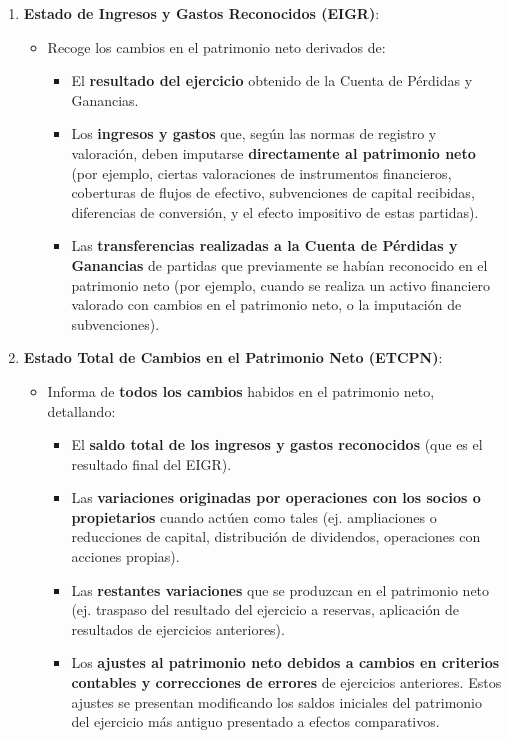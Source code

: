\documentclass[
  paper=a4,
  ,captions=tableheading
]{scrbook}
\providecommand{\tightlist}{%
  \setlength{\itemsep}{0pt}\setlength{\parskip}{0pt}}
\begin{document}
\begin{enumerate}
\def\labelenumi{\arabic{enumi}.}
\tightlist
\item
  \textbf{Estado de Ingresos y Gastos Reconocidos (EIGR)}:

  \begin{itemize}
  \tightlist
  \item
    Recoge los cambios en el patrimonio neto derivados de:

    \begin{itemize}
    \tightlist
    \item
      El \textbf{resultado del ejercicio} obtenido de la Cuenta de
      Pérdidas y Ganancias.
    \item
      Los \textbf{ingresos y gastos} que, según las normas de registro y
      valoración, deben imputarse \textbf{directamente al patrimonio
      neto} (por ejemplo, ciertas valoraciones de instrumentos
      financieros, coberturas de flujos de efectivo, subvenciones de
      capital recibidas, diferencias de conversión, y el efecto
      impositivo de estas partidas).
    \item
      Las \textbf{transferencias realizadas a la Cuenta de Pérdidas y
      Ganancias} de partidas que previamente se habían reconocido en el
      patrimonio neto (por ejemplo, cuando se realiza un activo
      financiero valorado con cambios en el patrimonio neto, o la
      imputación de subvenciones).
    \end{itemize}
  \end{itemize}
\item
  \textbf{Estado Total de Cambios en el Patrimonio Neto (ETCPN)}:

  \begin{itemize}
  \tightlist
  \item
    Informa de \textbf{todos los cambios} habidos en el patrimonio neto,
    detallando:

    \begin{itemize}
    \tightlist
    \item
      El \textbf{saldo total de los ingresos y gastos reconocidos} (que
      es el resultado final del EIGR).
    \item
      Las \textbf{variaciones originadas por operaciones con los socios
      o propietarios} cuando actúen como tales (ej. ampliaciones o
      reducciones de capital, distribución de dividendos, operaciones
      con acciones propias).
    \item
      Las \textbf{restantes variaciones} que se produzcan en el
      patrimonio neto (ej. traspaso del resultado del ejercicio a
      reservas, aplicación de resultados de ejercicios anteriores).
    \item
      Los \textbf{ajustes al patrimonio neto debidos a cambios en
      criterios contables y correcciones de errores} de ejercicios
      anteriores. Estos ajustes se presentan modificando los saldos
      iniciales del patrimonio del ejercicio más antiguo presentado a
      efectos comparativos.
    \end{itemize}
  \end{itemize}
\end{enumerate}
\end{document}
